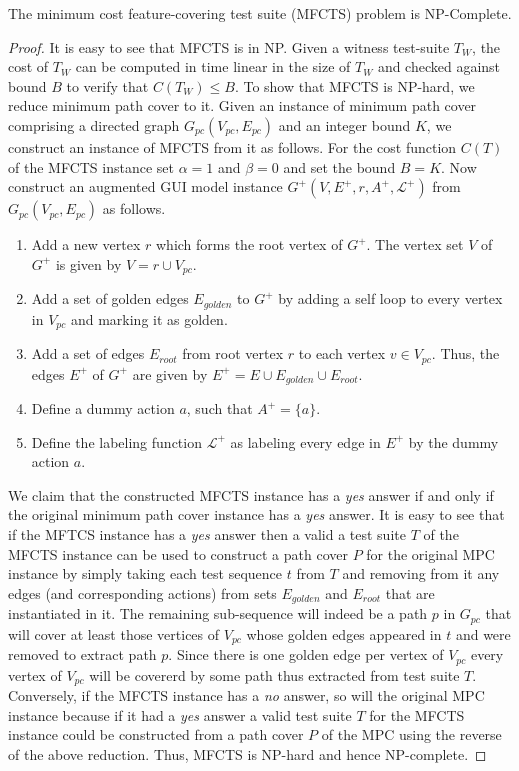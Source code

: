 \begin{theorem}
The minimum cost feature-covering test suite (MFCTS) problem is NP-Complete.
\end{theorem}

\begin{proof}
It is easy to see that MFCTS is in NP. Given a witness test-suite $T_W$, the cost of $T_W$ can be computed in time linear in the size of $T_W$ and checked against bound $B$ to verify that $C(T_W) \leq B$. To show that MFCTS is NP-hard, we reduce minimum path cover to it. Given an instance of minimum path cover comprising a directed graph $G_{pc}(V_{pc},E_{pc})$ and an integer bound $K$, we construct an instance of MFCTS from it as follows. For the cost function $C(T)$ of the MFCTS instance set $\alpha = 1$ and $\beta = 0$ and set the bound $B = K$. Now construct an augmented GUI model instance $G^+(V, E^+, r, A^+, \mathcal{L}^+)$ from $G_{pc}(V_{pc}, E_{pc})$ as follows.
\begin{enumerate}
\item Add a new vertex $r$ which forms the root vertex of $G^+$. The vertex set $V$ of $G^+$ is given by $V = r \cup V_{pc}$.
\item Add a set of golden edges $E_{golden}$ to $G^+$ by adding a self loop to every vertex in $V_{pc}$ and marking it as golden.
\item Add a set of edges $E_{root}$ from root vertex $r$ to each vertex $v \in V_{pc}$. Thus, the edges $E^+$ of $G^+$ are given by $E^+ = E \cup E_{golden} \cup E_{root}$.
\item Define a dummy action $a$, such that $A^+ = \{ a \}$.
\item Define the labeling function $\mathcal{L}^+$ as labeling every edge in $E^+$ by the dummy action $a$.
\end{enumerate}
We claim that the constructed MFCTS instance has a \textit{yes} answer if and only if the original minimum path cover instance has a \textit{yes} answer. It is easy to see that if the MFTCS instance has a \textit{yes} answer then a valid a test suite $T$ of the MFCTS instance can be used to construct a path cover $P$ for the original MPC instance by simply taking each test sequence $t$ from $T$ and removing from it any edges (and corresponding actions) from sets $E_{golden}$ and $E_{root}$ that are instantiated in it. The remaining sub-sequence will indeed be a path $p$ in $G_{pc}$ that will cover at least those vertices of $V_{pc}$ whose golden edges appeared in $t$ and were removed to extract path $p$. Since there is one golden edge per vertex of $V_{pc}$ every vertex of $V_{pc}$ will be covererd by some path thus extracted from test suite $T$. Conversely, if the MFCTS instance has a \textit{no} answer, so will the original MPC instance because if it had a \textit{yes} answer a valid test suite $T$ for the MFCTS instance could be constructed from a path cover $P$ of the MPC using the reverse of the above reduction. Thus, MFCTS is NP-hard and hence NP-complete.

\end{proof}
